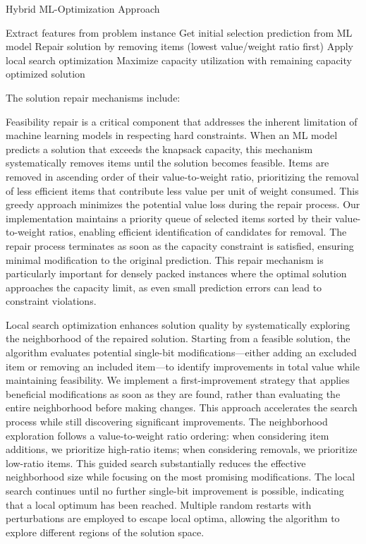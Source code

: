 \documentclass[conference, a4paper]{IEEEtran}
\begin{document}
\begin{algorithm}
\caption{Hybrid ML-Optimization Approach}
\label{alg:hybrid}
\begin{algorithmic}[1]
    \State Extract features from problem instance
    \State Get initial selection prediction from ML model
        \State Repair solution by removing items (lowest value/weight ratio first)
    \EndIf
    \State Apply local search optimization
    \State Maximize capacity utilization with remaining capacity
    \State \Return optimized solution
\EndProcedure
\end{algorithmic}
\end{algorithm}

The solution repair mechanisms include:

Feasibility repair is a critical component that addresses the inherent limitation of machine learning models in respecting hard constraints. When an ML model predicts a solution that exceeds the knapsack capacity, this mechanism systematically removes items until the solution becomes feasible. Items are removed in ascending order of their value-to-weight ratio, prioritizing the removal of less efficient items that contribute less value per unit of weight consumed. This greedy approach minimizes the potential value loss during the repair process. Our implementation maintains a priority queue of selected items sorted by their value-to-weight ratios, enabling efficient identification of candidates for removal. The repair process terminates as soon as the capacity constraint is satisfied, ensuring minimal modification to the original prediction. This repair mechanism is particularly important for densely packed instances where the optimal solution approaches the capacity limit, as even small prediction errors can lead to constraint violations.

Local search optimization enhances solution quality by systematically exploring the neighborhood of the repaired solution. Starting from a feasible solution, the algorithm evaluates potential single-bit modifications—either adding an excluded item or removing an included item—to identify improvements in total value while maintaining feasibility. We implement a first-improvement strategy that applies beneficial modifications as soon as they are found, rather than evaluating the entire neighborhood before making changes. This approach accelerates the search process while still discovering significant improvements. The neighborhood exploration follows a value-to-weight ratio ordering: when considering item additions, we prioritize high-ratio items; when considering removals, we prioritize low-ratio items. This guided search substantially reduces the effective neighborhood size while focusing on the most promising modifications. The local search continues until no further single-bit improvement is possible, indicating that a local optimum has been reached. Multiple random restarts with perturbations are employed to escape local optima, allowing the algorithm to explore different regions of the solution space.
\end{document}
